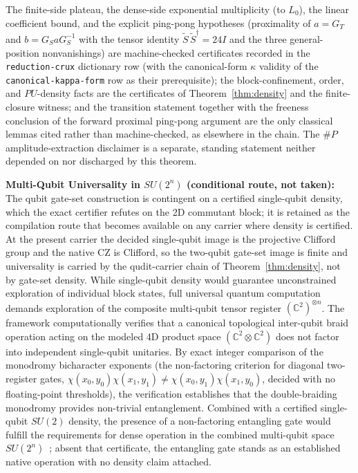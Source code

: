 The finite-side plateau, the dense-side exponential multiplicity (to $L_0$), the linear coefficient bound, and the explicit ping-pong hypotheses (proximality of $a=G_T$ and $b=G_S a G_S^{-1}$ with the tensor identity $\tilde S\,\tilde S^{\dagger}=24 I$ and the three general-position nonvanishings) are machine-checked certificates recorded in the \texttt{reduction-crux} dictionary row (with the canonical-form $\kappa$ validity of the \texttt{canonical-kappa-form} row as their prerequisite); the block-confinement, order, and $PU$-density facts are the certificates of Theorem~\ref{thm:density} and the finite-closure witness; and the transition statement together with the freeness conclusion of the forward proximal ping-pong argument are the only classical lemmas cited rather than machine-checked, as elsewhere in the chain. The $\#P$ amplitude-extraction disclaimer is a separate, standing statement neither depended on nor discharged by this theorem.

\textbf{Multi-Qubit Universality in \texorpdfstring{$SU(2^n)$}{SU (2n)} (conditional route, not taken):} The qubit gate-set construction is contingent on a certified single-qubit density, which the exact certifier refutes on the 2D commutant block; it is retained as the compilation route that becomes available on any carrier where density is certified. At the present carrier the decided single-qubit image is the projective Clifford group and the native CZ is Clifford, so the two-qubit gate-set image is finite and universality is carried by the qudit-carrier chain of Theorem~\ref{thm:density}, not by gate-set density. While single-qubit density would guarantee unconstrained exploration of individual block states, full universal quantum computation demands exploration of the composite multi-qubit tensor register ${(\mathbb{C}^2)}^{\otimes n}$. The framework computationally verifies that a canonical topological inter-qubit braid operation acting on the modeled 4D product space $(\mathbb{C}^2 \otimes \mathbb{C}^2)$ does not factor into independent single-qubit unitaries. By exact integer comparison of the monodromy bicharacter exponents (the non-factoring criterion for diagonal two-register gates, $\chi(x_0,y_0)\chi(x_1,y_1) \neq \chi(x_0,y_1)\chi(x_1,y_0)$, decided with no floating-point thresholds), the verification establishes that the double-braiding monodromy provides non-trivial entanglement. Combined with a certified single-qubit $SU(2)$ density, the presence of a non-factoring entangling gate would fulfill the requirements for dense operation in the combined multi-qubit space $SU(2^n)$~\cite{dawson2005}; absent that certificate, the entangling gate stands as an established native operation with no density claim attached.

